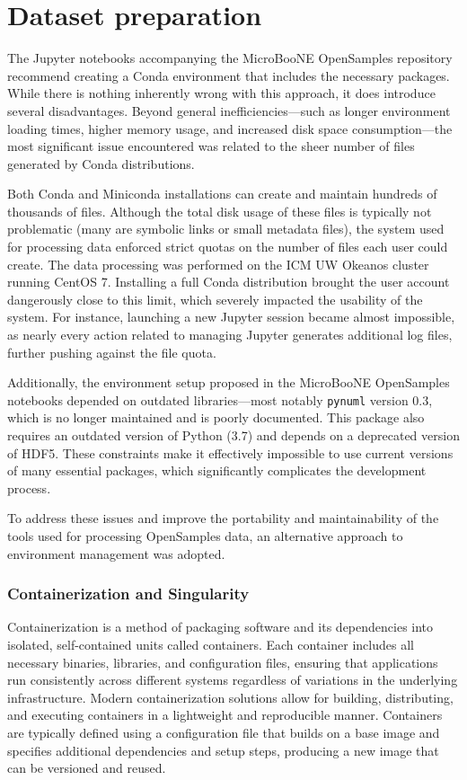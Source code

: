 \documentclass{pracalicmgr}
\begin{document}
\chapter{Dataset preparation}

The Jupyter notebooks accompanying the MicroBooNE OpenSamples repository recommend creating a Conda environment that includes the necessary packages. While there is nothing inherently wrong with this approach, it does introduce several disadvantages. Beyond general inefficiencies—such as longer environment loading times, higher memory usage, and increased disk space consumption—the most significant issue encountered was related to the sheer number of files generated by Conda distributions.

Both Conda and Miniconda installations can create and maintain hundreds of thousands of files. Although the total disk usage of these files is typically not problematic (many are symbolic links or small metadata files), the system used for processing data enforced strict quotas on the number of files each user could create. The data processing was performed on the ICM UW Okeanos cluster running CentOS 7. Installing a full Conda distribution brought the user account dangerously close to this limit, which severely impacted the usability of the system. For instance, launching a new Jupyter session became almost impossible, as nearly every action related to managing Jupyter generates additional log files, further pushing against the file quota.

Additionally, the environment setup proposed in the MicroBooNE OpenSamples notebooks depended on outdated libraries—most notably \texttt{pynuml} version 0.3, which is no longer maintained and is poorly documented. This package also requires an outdated version of Python (3.7) and depends on a deprecated version of HDF5. These constraints make it effectively impossible to use current versions of many essential packages, which significantly complicates the development process.

To address these issues and improve the portability and maintainability of the tools used for processing OpenSamples data, an alternative approach to environment management was adopted.

\subsection{Containerization and Singularity}

Containerization is a method of packaging software and its dependencies into isolated, self-contained units called containers. Each container includes all necessary binaries, libraries, and configuration files, ensuring that applications run consistently across different systems regardless of variations in the underlying infrastructure. Modern containerization solutions allow for building, distributing, and executing containers in a lightweight and reproducible manner. Containers are typically defined using a configuration file that builds on a base image and specifies additional dependencies and setup steps, producing a new image that can be versioned and reused.
\end{document}
